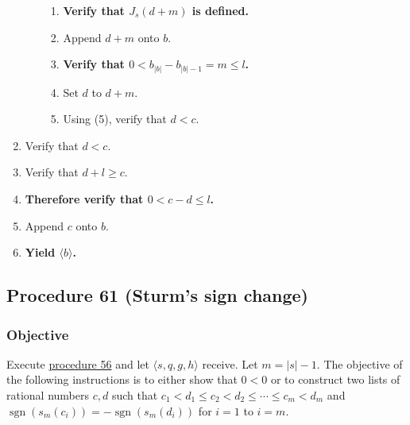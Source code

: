 \documentclass[twocolumn]{article}
\DeclareMathOperator{\sgn}{sgn}
\begin{document}
\begin{enumerate}
\begin{enumerate}
						\begin{enumerate}
							\item \textbf{Verify that $J_s(d+m)$ is defined.}
							\item Append $d+m$ onto $b$.
							\item \textbf{Verify that $0<b_{\lvert b\rvert}-b_{\lvert b\rvert-1}=m\le l$.}
							\item Set $d$ to $d+m$.
							\item Using (5), verify that $d<c$.
						\end{enumerate}
					\end{enumerate}
					\item Verify that $d<c$.
					\item Verify that $d+l\ge c$.
					\item \textbf{Therefore verify that $0<c-d\le l$.}
					\item Append $c$ onto $b$.
					\item \textbf{Yield $\langle b\rangle$.}
				\end{enumerate}
		\subsection{Procedure 61 (Sturm's sign change)}\label{sec:procedure 61}
			\subsubsection{Objective}
				Execute \hyperref[sec:procedure 56]{procedure 56} and let $\langle s,q,g,h\rangle$ receive. Let $m=\lvert s\rvert-1$. The objective of the following instructions is to either show that $0<0$ or to construct two lists of rational numbers $c,d$ such that $c_1<d_1\le c_2<d_2\le\cdots\le c_m<d_m$ and $\sgn(s_m(c_i))=-\sgn(s_m(d_i))$ for $i=1$ to $i=m$.
\end{document}
